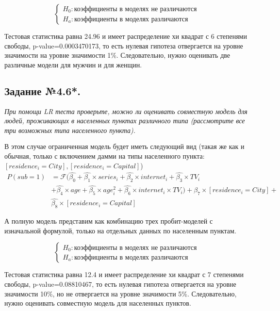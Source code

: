 \documentclass[a4paper,12pt]{article}
\begin{document}
	\begin{equation*}
		\begin{cases}
			H_0:\text{коэффициенты в моделях не различаются}\\
			H_a: \text{коэффициенты в моделях различаются}
		\end{cases}
	\end{equation*}		
	
	Тестовая статистика равна 24.96 и имеет распределение хи квадрат с 6 степенями свободы, p-value=0.0003470173, то есть нулевая гипотеза отвергается на уровне значимости на уровне значимости 1\%. Следовательно, нужно оценивать две различные модели для мужчин и для женщин.
	
	\subsection{Задание №4.6*.}
	\textit{
	При помощи LR теста проверьте, можно ли оценивать совместную модель для людей, проживающих в населенных пунктах различного типа (рассмотрите все три возможных типа населенного пункта). }
	
	\vspace{0.2cm}
	
	В этом случае ограниченная модель будет иметь следующий вид (такая же как и обычная, только с включением дамми на типы населенного пункта: $ [residence_i=City],  [residence_i=Capital]$)
	\begin{align*}
		P(sub=1)&= \mathcal{F} (\hat{\beta_0} + \hat{\beta_1} \times series_i+ \hat{\beta_2} \times internet_i  +\hat{\beta_3}  \times TV_i \\&+ \hat{\beta_4} \times age+ \hat{\beta_5}\times age_i^2 +\hat{\beta_6} \times internet_i \times TV_i)+\hat{\beta_7}\times [residence_i=City]+\\&\hat{\beta_8}\times [residence_i=Capital]
	\end{align*}
	
	А полную модель представим как комбинацию трех пробит-моделей с изначальной формулой, только на отдельных данных по населенным пунктам.
	
	\begin{equation*}
		\begin{cases}
			H_0:\text{коэффициенты в моделях не различаются}\\
			H_a: \text{коэффициенты в моделях различаются}
		\end{cases}
	\end{equation*}		
	
	Тестовая статистика равна 12.4 и имеет распределение хи квадрат с 7 степенями свободы, p-value=0.08810467, то есть нулевая гипотеза отвергается на уровне значимости 10\%, но не отвергается на уровне значимости 5\%. Следовательно, нужно оценивать совместную модель для населенных пунктов.
	
\end{document}
